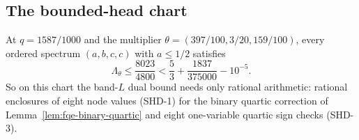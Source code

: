 \subsection{The bounded-head chart}
\label{sec:fqe-small-head-dual}

\begin{lemma}\label{lem:fqe-small-head-dual}
At $q=1587/1000$ and the multiplier $\theta=(397/100,3/20,159/100)$,
every ordered spectrum $(a,b,c,c)$ with $a\le1/2$ satisfies
\[
 \Lambda_\theta\le\frac{8023}{4800}
 <\frac53+\frac{1837}{375000}-10^{-5}.
\]
So on this chart the band-$L$ dual bound needs only rational arithmetic: rational enclosures of eight node values (SHD-1) for the binary
quartic correction of Lemma~\ref{lem:fqe-binary-quartic} and eight one-variable quartic sign checks (SHD-3).
\end{lemma}
